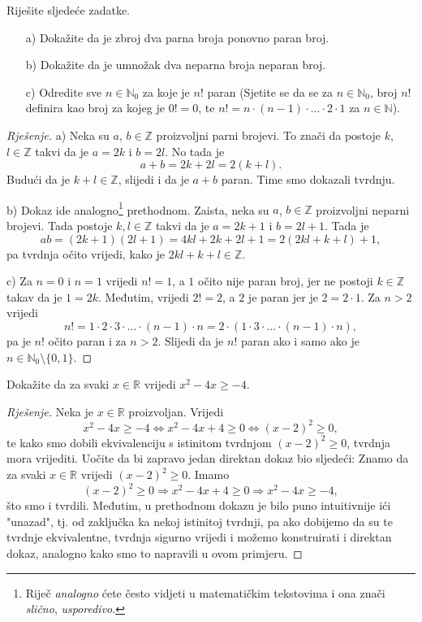 \begin{exercise}
Riješite sljedeće zadatke. \begin{itemize}

\item[a)] Dokažite da je zbroj dva parna broja ponovno paran broj.
\item[b)] Dokažite da je umnožak dva neparna broja neparan broj.
\item[c)] Odredite sve $n\in \mathbb{N}_0$ za koje je $n!$ paran (Sjetite se da se za $n\in \mathbb{N}_0$, broj $n!$ definira kao broj za kojeg je $0!=0$, te $n!=n\cdot (n-1)\cdot ...\cdot 2\cdot 1$ za $n\in \mathbb{N}$).
\end{itemize}
\end{exercise}
\begin{proof}[Rješenje]
a) Neka su $a$, $b\in \mathbb{Z}$ proizvoljni parni brojevi. To znači da postoje $k$, $l\in \mathbb{Z}$ takvi da je $a=2k$ i $b=2l$. No tada je $$a+b=2k+2l=2(k+l).$$ Budući da je $k+l\in \mathbb{Z}$, slijedi i da je $a+b$ paran. Time smo dokazali tvrdnju.

b) Dokaz ide analogno\footnote{Riječ \textit{analogno} ćete često vidjeti u matematičkim tekstovima i ona znači \textit{slično}, \textit{usporedivo}.} prethodnom. Zaista, neka su $a$, $b\in \mathbb{Z}$ proizvoljni neparni brojevi. Tada postoje $k, l\in \mathbb{Z}$ takvi da je $a=2k+1$ i $b=2l+1$. Tada je
$$ab=(2k+1)(2l+1)=4kl+2k+2l+1=2(2kl+k+l)+1,$$
pa tvrdnja očito vrijedi, kako je $2kl+k+l\in \mathbb{Z}$.

c) Za $n=0$ i $n=1$ vrijedi $n!=1$, a $1$ očito nije paran broj, jer ne postoji $k\in \mathbb{Z}$ takav da je $1=2k$. Međutim, vrijedi $2!=2$, a $2$ je paran jer je $2=2\cdot 1$. Za $n>2$ vrijedi
$$n!=1\cdot 2\cdot 3\cdot ...\cdot (n-1)\cdot n=2\cdot (1\cdot 3\cdot ...\cdot (n-1)\cdot n),$$
pa je $n!$ očito paran i za $n>2$. Slijedi da je $n!$ paran ako i samo ako je $n\in \mathbb{N}_0\setminus \{0, 1\}$.
\end{proof}
\begin{exercise}
Dokažite da za svaki $x\in \mathbb{R}$ vrijedi $x^2-4x\geq -4$.
\end{exercise}
\begin{proof}[Rješenje]
Neka je $x\in \mathbb{R}$ proizvoljan. Vrijedi
$$x^2-4x\geq -4\Leftrightarrow x^2-4x+4\geq 0\Leftrightarrow (x-2)^2\geq 0,$$
te kako smo dobili ekvivalenciju s istinitom tvrdnjom $(x-2)^2\geq 0$, tvrdnja mora vrijediti. Uočite da bi zapravo jedan direktan dokaz bio sljedeći: Znamo da za svaki $x\in \mathbb{R}$ vrijedi $(x-2)^2\geq 0$. Imamo
$$(x-2)^2\geq 0\Rightarrow x^2-4x+4\geq 0\Rightarrow x^2-4x\geq -4,$$
što smo i tvrdili. Međutim, u prethodnom dokazu je bilo puno intuitivnije ići "unazad", tj. od zaključka ka nekoj istinitoj tvrdnji, pa ako dobijemo da su te tvrdnje ekvivalentne, tvrdnja sigurno vrijedi i možemo konstruirati i direktan dokaz, analogno kako smo to napravili u ovom primjeru.
\end{proof}
